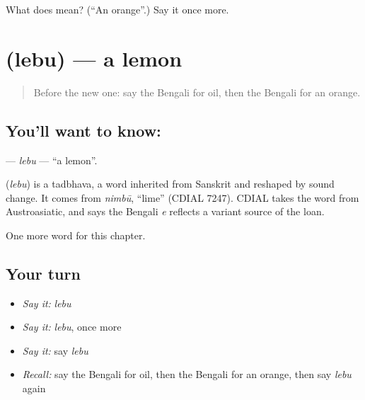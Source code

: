 \begin{tcolorbox}[breakable,colback=teal!4,colframe=teal!35!black,title={Before you move on}]
What does  mean? (\textquotedblleft{}An orange\textquotedblright{}.) Say it once more.
\end{tcolorbox}
\section[\texorpdfstring{\bn{লেবু} (lebu)}{লেবু (lebu)}]{ (lebu) — a lemon}

\label{lesson:BN-C58-lebu}



\begin{quote}
Before the new one: say the Bengali for oil, then the Bengali for an orange.
\end{quote}

\subsection*{You'll want to know: }
\textbf{} — \emph{lebu} — \textquotedblleft{}a lemon\textquotedblright{}.

\begin{cousinweb}
\textbf{} (\emph{lebu}) is a tadbhava, a word inherited from Sanskrit and reshaped by sound change. It comes from \emph{nimbū}, \textquotedblleft{}lime\textquotedblright{} (CDIAL 7247). CDIAL takes the word from Austroasiatic, and says the Bengali \emph{e} reflects a variant source of the loan.
\end{cousinweb}

\begin{grammarlens}[title={What you've built}]
One more word for this chapter.
\end{grammarlens}

\subsection*{Your turn}
\begin{itemize}
\raggedright
  \item \emph{Say it:} \emph{lebu}
  \item \emph{Say it:} \emph{lebu}, once more
  \item \emph{Say it:} say \emph{lebu}
  \item \emph{Recall:} say the Bengali for oil, then the Bengali for an orange, then say \emph{lebu} again
\end{itemize}

